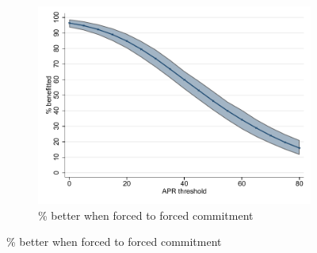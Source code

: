 \documentclass[oneside,11pt]{article}
\begin{document}
\begin{figure}[H]
\begin{center}
\begin{subfigure}{0.45\textwidth}
    \end{subfigure}
        \begin{subfigure}{0.45\textwidth}
        \caption{\% better when forced to forced commitment}
        \centering
        \includegraphics[width=\textwidth]{Figuras/line_better_forceall_apr_te_cf.pdf}
        
    \end{subfigure}
    

\end{center}
\end{figure}
\end{document}
